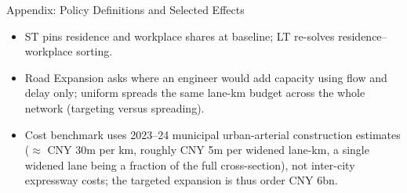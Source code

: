 \documentclass[11pt,aspectratio=169]{beamer}
\newcommand{\navback}[1]{\par\vspace{0.35em}\noindent\hfill\hyperlink{#1}{\beamerreturnbutton{back}}}
\begin{document}
\begin{frame}[label=apppolicy]{Appendix: Policy Definitions and Selected Effects}
\scriptsize
\begin{center}
\end{center}
\vspace{0.2em}
\begin{itemize}\footnotesize
  \item ST pins residence and workplace shares at baseline; LT re-solves residence--workplace sorting.
  \item Road Expansion asks where an engineer would add capacity using flow and delay only; uniform spreads the same lane-km budget across the whole network (targeting versus spreading).
  \item Cost benchmark uses 2023--24 municipal urban-arterial construction estimates ($\approx$ CNY 30m per km, roughly CNY 5m per widened lane-km, a single widened lane being a fraction of the full cross-section), not inter-city expressway costs; the targeted expansion is thus order CNY 6bn.
\end{itemize}
\navback{result4}
\end{frame}
\end{document}
